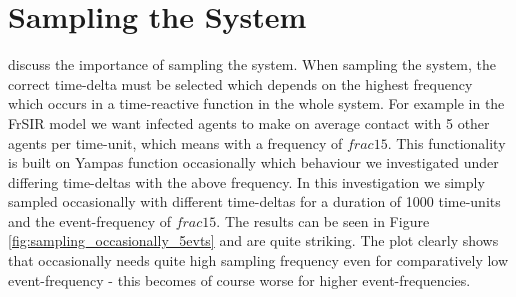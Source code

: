 \section{Sampling the System}
discuss the importance of sampling the system. When sampling the system, the correct time-delta must be selected which depends on the highest frequency which occurs in a time-reactive function in the whole system. For example in the FrSIR model we want infected agents to make on average contact with 5 other agents per time-unit, which means with a frequency of $frac{1}{5}$. This functionality is built on Yampas function occasionally which behaviour we investigated under differing time-deltas with the above frequency. In this investigation we simply sampled occasionally with different time-deltas for a duration of 1000 time-units and the event-frequency of $frac{1}{5}$. The results can be seen in Figure \ref{fig:sampling_occasionally_5evts} and are quite striking. The plot clearly shows that occasionally needs quite high sampling frequency even for comparatively low event-frequency - this becomes of course worse for higher event-frequencies.

